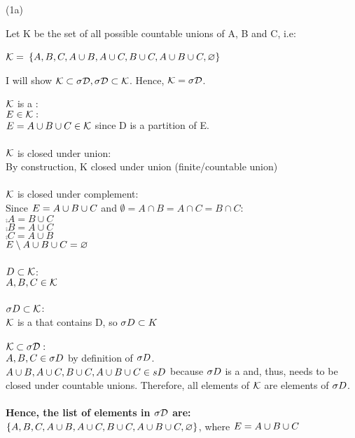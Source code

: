 (1a)

Let K be the set of all possible countable unions of A, B and C, i.e:

$ \cal{K} = $
$\{ A, B, C, A \cup B, A \cup C, B \cup C, A \cup B \cup C, \varnothing \} $

I will show $\cal{K} \subset \sigma D, \sigma D \subset \cal{K}$. Hence, $\cal{K} = \sigma D$.

$ \cal{K} $ is a \sa:
\\
$ E \in \cal{K}: $
\\
$E = A \cup B \cup C \in \cal{K}$ since D is a partition of E.
\\
\\
$\cal{K}$ is closed under union:
\\
By construction, K closed under union (finite/countable union)
\\ \\
$\cal{K}$ is closed under complement:
\\
Since $E = A \cup B \cup C $ and $\emptyset = A \cap B = A \cap C = B \cap C$:
\\
$\comp{A} = B \cup C $  \\
$\comp{B} = A \cup C $ \\
$\comp{C} = A \cup B $ \\
$E \setminus{A \cup B \cup C} = \varnothing $ \\
\\
$D \subset \cal{K}$: \\
$A, B, C \in \cal{K}$
\\ \\
$ \sigma D \subset \cal{K} $: \\
$ \cal{K} $ is a \sa that contains D, so $ \sigma D \subset K$
\\ \\
$\cal{K} \subset  \sigma D:$
\\
$A, B, C \in \sigma D $ by definition of $\sigma D$.
\\
$A \cup B, A \cup C, B \cup C, A \cup B \cup C \in sD $ because $\sigma D$ is a \sa and, thus, needs to be closed under countable unions.
Therefore, all elements of $\cal{K}$ are elements of $\sigma D$.
\\ \\
\textbf{Hence, the list of elements in $\sigma \cal{D}$ are:
\\
$\{ A, B, C, A \cup B, A \cup C, B \cup C, A \cup B \cup C, \varnothing \}$}, where $E = A \cup B \cup C $
